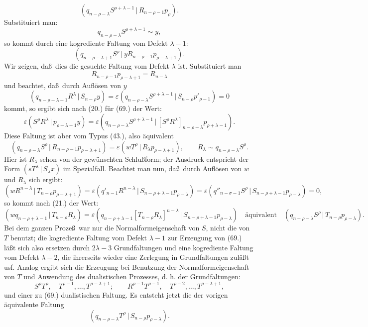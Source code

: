 \documentclass[11pt]{article}
\providecommand{\pair}[2]{(#1\,|\,#2)}
\providecommand{\eps}{\varepsilon}
\begin{document}
\[
 \pair{q_{n-\rho-\lambda}S^{\rho+\lambda-1}}{R_{n-\rho-1}p_\rho}.
\]
Substituiert man:
\[
 q_{n-\rho-\lambda}S^{\rho+\lambda-1}\sim y,
\]
so kommt durch eine kogrediente Faltung vom Defekt $\lambda-1$:
\begin{equation}
 \pair{q_{n-\rho-\lambda+1}S^\rho}{yR_{n-\rho-1}p_{\rho-\lambda+1}}.
\tag{69}
\end{equation}
Wir zeigen, da\ss\ dies die gesuchte Faltung vom Defekt $\lambda$ ist. Substituiert man
\[
 R_{n-\rho-1}p_{\rho-\lambda+1}=R_{n-\lambda}
\]
und beachtet, da\ss\ durch Aufl\"osen von $y$
\[
 \pair{q_{n-\rho-\lambda+1}R^\lambda}{S_{n-\rho}y}
 =\eps\pair{q_{n-\rho-\lambda}S^{\rho+\lambda-1}}{S_{n-\rho}p'_{\rho-1}}=0
\]
kommt, so ergibt sich nach (20.) f\"ur (69.) der Wert:
\[
 \eps\pair{S^\rho R^\lambda}{p_{\rho+\lambda-1}y}
 =\eps\pair{q_{n-\rho-\lambda}S^{\rho+\lambda-1}}{[S^\rho R^\lambda]_{n-\rho-\lambda}p_{\rho+\lambda-1}}.
\]
Diese Faltung ist aber vom Typus (43.), also \"aquivalent
\[
 \pair{q_{n-\rho-\lambda}S^\rho}{R_{n-\rho-1}p_{\rho-\lambda+1}}
 =\eps\pair{wT^\rho}{R_\lambda p_{\rho-\lambda+1}},
 \qquad R_\lambda\sim q_{n-\rho-\lambda}S^\rho.
\]
Hier ist $R_\lambda$ schon von der gew\"unschten Schlu\ss form; der Ausdruck entspricht der Form $\pair{sT^\lambda}{S_\lambda x}$ im Spezialfall. Beachtet man nun, da\ss\ durch Aufl\"osen von $w$ und $R_\lambda$ sich ergibt:
\[
 \pair{wR^{n-\lambda}}{T_{n-\rho}p_{\rho-\lambda+1}}
 =\eps\pair{q'_{n-1}R^{n-\lambda}}{S_{n-\rho+\lambda-1}p_{\rho-\lambda}}
 =\eps\pair{q''_{n-\sigma-1}S^\rho}{S_{n-\rho+\lambda-1}p_{\rho-\lambda}}=0,
\]
so kommt nach (21.) der Wert:
\[
 \pair{wq_{n-\rho+\lambda-1}}{T_{n-\rho}R_\lambda}
 =\eps\pair{q_{n-\rho+\lambda-1}[T_{n-\rho}R_\lambda]^{n-\lambda}}{S_{n-\rho+\lambda-1}p_{\rho-\lambda}}
 \quad\text{\"aquivalent}\quad
 \pair{q_{n-\rho-\lambda}S^\rho}{T_{n-\rho}p_{\rho-\lambda}}.
\]
Bei dem ganzen Proze\ss\ war nur die Normalformeigenschaft von $S$, nicht die von $T$ benutzt; die kogrediente Faltung vom Defekt $\lambda-1$ zur Erzeugung von (69.) l\"a\ss t sich also ersetzen durch $2\lambda-3$ Grundfaltungen und eine kogrediente Faltung vom Defekt $\lambda-2$, die ihrerseits wieder eine Zerlegung in Grundfaltungen zul\"a\ss t usf. Analog ergibt sich die Erzeugung bei Benutzung der Normalformeigenschaft von $T$ und Anwendung des dualistischen Prozesses, d. h. der Grundfaltungen:
\[
 S^\rho T^\rho,\quad T^{\rho-1},\ldots,T^{\rho-\lambda+1};
 \qquad R^{\rho-1}T^{\rho-1},\quad T^{\rho-2},\ldots,T^{\rho-\lambda+1},
\]
und einer zu (69.) dualistischen Faltung. Es entsteht jetzt die der vorigen \"aquivalente Faltung
\[
 \pair{q_{n-\rho-\lambda}T^\rho}{S_{n-\rho}p_{\rho-\lambda}}.
\]
\end{document}
